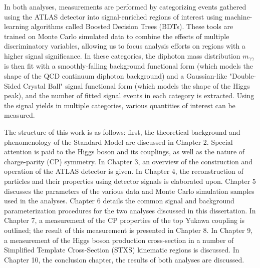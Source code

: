 In both analyses, measurements are performed by categorizing events gathered using the ATLAS detector into signal-enriched regions of interest using machine-learning algorithms called Boosted Decision Trees (BDTs). These tools are trained on Monte Carlo simulated data to combine the effects of multiple discriminatory variables, allowing us to focus analysis efforts on regions with a higher signal significance. In these categories, the diphoton mass distribution $m_{\gamma \gamma}$ is then fit with a smoothly-falling background functional form (which models the shape of the QCD continuum diphoton background) and a Gaussian-like "Double-Sided Crystal Ball" signal functional form (which models the shape of the Higgs peak), and the number of fitted signal events in each category is extracted. Using the signal yields in multiple categories, various quantities of interest can be measured.

The structure of this work is as follows: first, the theoretical background and phenomenology of the Standard Model are discussed in Chapter 2. Special attention is paid to the Higgs boson and its couplings, as well as the nature of charge-parity (CP) symmetry. In Chapter 3, an overview of the construction and operation of the ATLAS detector is given. In Chapter 4, the reconstruction of particles and their properties using detector signals is elaborated upon. Chapter 5 discusses the parameters of the various data and Monte Carlo simulation samples used in the analyses. Chapter 6 details the common signal and background parameterization procedures for the two analyses discussed in this dissertation. In Chapter 7, a measurement of the CP properties of the top Yukawa coupling is outlined; the result of this measurement is presented in Chapter 8. In Chapter 9, a measurement of the Higgs boson production cross-section in a number of Simplified Template Cross-Section (STXS) kinematic regions is discussed. In Chapter 10, the conclusion chapter, the results of both analyses are discussed.